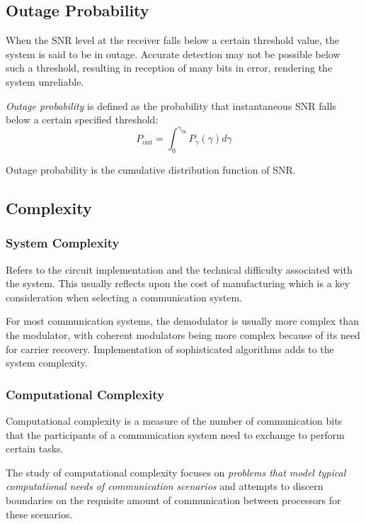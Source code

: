 \subsection{Outage Probability}
When the \gls{SNR} level at the receiver falls below a certain threshold value, the system is said to be in outage. Accurate detection may not be possible below such a threshold, resulting in reception of many bits in error, rendering the system unreliable\cite{MIMO}.

\emph{Outage probability} is defined as the probability that instantaneous SNR falls below a certain specified threshold:
\[
	P_{\text{out}} = \int_0^{\gamma_{\text{th}}} P_\gamma (\gamma) d\gamma
\]
\begin{mathDef}
\end{mathDef}
Outage probability is the cumulative distribution function of SNR.

\subsection{Complexity}
\subsubsection{System Complexity}
Refers to the circuit implementation and the technical difficulty associated with the system. This usually reflects upon the cost of manufacturing which is a key consideration when selecting a communication system.

For most communication systems, the demodulator is usually more complex than the modulator, with coherent modulators being more complex because of its need for carrier recovery. Implementation of sophisticated algorithms adds to the system complexity.
\subsubsection{Computational Complexity}
Computational complexity is a measure of the number of communication bits that the participants of a communication system need to exchange to perform certain tasks.

The study of computational complexity focuses on \emph{problems that model typical computational needs of communication scenarios} and attempts to discern boundaries on the requisite amount of communication between processors for these scenarios.

